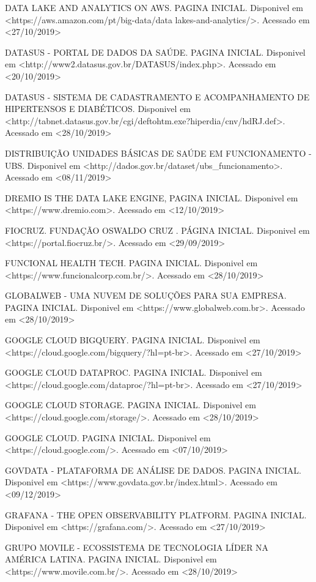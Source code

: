 \documentclass[
	12pt,				%
	openright,			%
	oneside,			%
	a4paper,			%
	chapter=TITLE,		%
	section=TITLE,		%
	subsection=TITLE,	%
	subsubsection=TITLE,%
	english,			%
	brazil				%
	]{abntex2}
\theoremstyle{definition}
\begin{document}
DATA LAKE AND ANALYTICS ON AWS. PAGINA INICIAL. Disponivel em <https://aws.amazon.com/pt/big-data/data lakes-and-analytics/>. Acessado em <27/10/2019>

DATASUS - PORTAL DE DADOS DA SAÚDE. PAGINA INICIAL. Disponivel em <http://www2.datasus.gov.br/DATASUS/index.php>. Acessado em <20/10/2019>

DATASUS - SISTEMA DE CADASTRAMENTO E ACOMPANHAMENTO DE HIPERTENSOS E DIABÉTICOS. Disponivel em <http://tabnet.datasus.gov.br/cgi/deftohtm.exe?hiperdia/cnv/hdRJ.def>. Acessado em <28/10/2019>

DISTRIBUIÇÃO UNIDADES BÁSICAS DE SAÚDE EM FUNCIONAMENTO - UBS. Disponivel em <http://dados.gov.br/dataset/ubs_funcionamento>. Acessado em <08/11/2019>

DREMIO IS THE DATA LAKE ENGINE, PAGINA INICIAL. Disponivel em <https://www.dremio.com>. Acessado em <12/10/2019>

FIOCRUZ. FUNDAÇÃO OSWALDO CRUZ . PÁGINA INICIAL. Disponivel em <https://portal.fiocruz.br/>. Acessado em <29/09/2019>

FUNCIONAL HEALTH TECH. PAGINA INICIAL. Disponivel em <https://www.funcionalcorp.com.br/>. Acessado em <28/10/2019>

GLOBALWEB - UMA NUVEM DE SOLUÇÕES PARA SUA EMPRESA. PAGINA INICIAL. Disponivel em <https://www.globalweb.com.br>. Acessado em <28/10/2019>

GOOGLE CLOUD BIGQUERY. PAGINA INICIAL. Disponivel em <https://cloud.google.com/bigquery/?hl=pt-br>. Acessado em <27/10/2019>

GOOGLE CLOUD DATAPROC. PAGINA INICIAL. Disponivel em <https://cloud.google.com/dataproc/?hl=pt-br>. Acessado em <27/10/2019>

GOOGLE CLOUD STORAGE. PAGINA INICIAL. Disponivel em <https://cloud.google.com/storage/>. Acessado em <28/10/2019>

GOOGLE CLOUD. PAGINA INICIAL. Disponivel em <https://cloud.google.com/>. Acessado em <07/10/2019>

GOVDATA - PLATAFORMA DE ANÁLISE DE DADOS. PAGINA INICIAL. Disponivel em <https://www.govdata.gov.br/index.html>. Acessado em <09/12/2019>

GRAFANA - THE OPEN OBSERVABILITY PLATFORM. PAGINA INICIAL. Disponivel em <https://grafana.com/>. Acessado em <27/10/2019>

GRUPO MOVILE - ECOSSISTEMA DE TECNOLOGIA LÍDER NA AMÉRICA LATINA. PAGINA INICIAL. Disponivel em <https://www.movile.com.br/>. Acessado em <28/10/2019>
\end{document}
